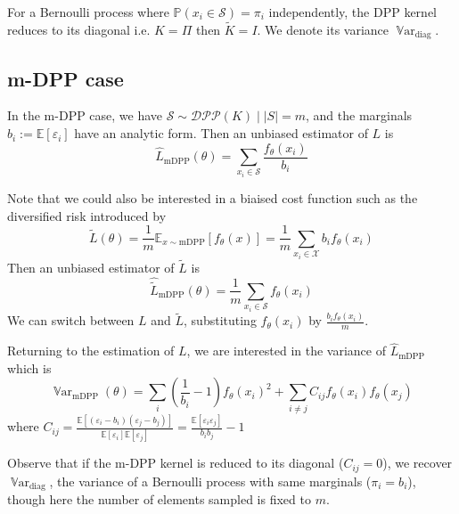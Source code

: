 \documentclass{article} %
\renewcommand{\epsilon}{\varepsilon}
\newcommand{\PP}{\mathbb{P}}
\newcommand{\EE}{\mathbb{E}}
\newcommand{\Var}{\operatorname{\mathbb V ar}}
\newcommand{\1}{\mathds{1}} %
\theoremstyle{definition} %
\begin{document}
For a Bernoulli process where $\PP(x_i \in \mathcal S) = \pi_i$ independently, the DPP kernel reduces to its diagonal i.e. $K = \Pi$ then $\tilde K = I$. We denote its variance $\Var_{\textrm{diag}}$.


\subsection{m-DPP case}

In the m-DPP case, we have $\mathcal S \sim \mathcal{DPP}(K) \mid |S|=m$, and the marginals $b_{i} := \mathbb{E}\left[\epsilon_{i}\right]$ have an analytic form. Then an unbiased estimator of $L$ is
\begin{equation*}
	\hat L_{\textrm{mDPP}}(\theta) = \sum_{x_i\in \mathcal S} \frac{f_\theta(x_i)}{b_i}
\end{equation*}

Note that we could also be interested in a biaised cost function such as the diversified risk introduced by \cite{zhang2017dppminibatch}
$$
\tilde L(\theta) =\frac{1}{m}\EE_{x \sim \textrm{mDPP}}[f_\theta(x)]=\frac{1}{m}\sum_{x_i \in \mathcal X} b_{i} f_\theta\left(x_{i}\right)
$$
Then an unbiased estimator of $\tilde L$ is
\begin{equation*}
	\hat{\tilde L}_{\textrm{mDPP}}(\theta) = \frac{1}{m}\sum_{x_i\in \mathcal S} f_\theta(x_i)
\end{equation*}
We can switch between $L$ and $\tilde L$, substituting $f_\theta(x_i)$ by $\frac{b_i f_\theta(x_i)}{m}$.

Returning to the estimation of $L$, we are interested in the variance of $\hat L_{\textrm{mDPP}}$ which is
\begin{equation}
	\Var_{\textrm{mDPP}}(\theta)=\sum_{i}\left(\frac{1}{b_i}-1\right) f_\theta(x_i)^2
	+ \sum_{i \neq j} C_{ij}f_\theta(x_i) f_\theta(x_j)
\end{equation}
where $C_{ij}=\frac{\mathbb{E}\left[\left(\epsilon_{i}-b_{i}\right)\left(\epsilon_{j}-b_{j}\right)\right]}{\mathbb{E}\left[\epsilon_{i}\right] \mathbb{E}\left[\epsilon_{j}\right]}=\frac{\mathbb{E}\left[\epsilon_{i} \epsilon_{j}\right]}{b_{i} b_{j}}-1
$

Observe that if the m-DPP kernel is reduced to its diagonal ($C_{ij} = 0$), we recover $\Var_{\textrm{diag}}$, the variance of a Bernoulli process with same marginals ($\pi_i = b_i$), though here the number of elements sampled is fixed to $m$.
\end{document}
